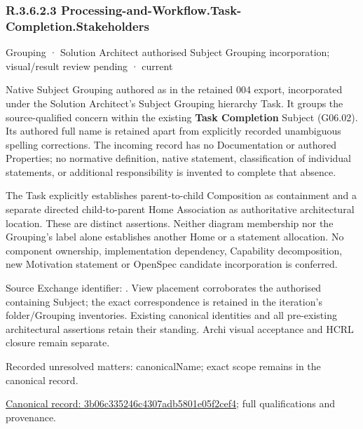 \subsubsection*{R.3.6.2.3 Processing-and-Workflow.Task-Completion.Stakeholders}
\label{navigation:R.3.6.2.3}

\label{element:3b06c335246c4307adb5801e05f2cef4}
{\small Grouping · Solution Architect authorised Subject Grouping incorporation; visual/result review pending · current}\par

Native Subject Grouping authored as \texttt{} in the retained 004 export,
incorporated under the Solution Architect's Subject Grouping hierarchy Task.
It groups the source-qualified \texttt{} concern within
the existing \textbf{Task Completion} Subject (G06.02). Its authored full name
is retained apart from explicitly recorded unambiguous spelling corrections.
The incoming record has no Documentation or authored Properties; no normative
definition, native statement, classification of individual statements, or
additional responsibility is invented to complete that absence.



The Task explicitly establishes parent-to-child Composition as containment and
a separate directed child-to-parent Home Association as authoritative architectural
location. These are distinct assertions. Neither diagram membership nor the
Grouping's label alone establishes another Home or a statement allocation.
No component ownership, implementation dependency, Capability decomposition,
new Motivation statement or OpenSpec candidate incorporation is conferred.



Source Exchange identifier: \texttt{}. View placement corroborates
the authorised containing Subject; the exact correspondence is retained in the
iteration's folder/Grouping inventories. Existing canonical identities and all
pre-existing architectural assertions retain their standing. Archi visual
acceptance and HCRL closure remain separate.


{\small Recorded unresolved matters: canonicalName; exact scope remains in the canonical record.}\par
{\footnotesize \href{../../../../continuum/grouping/3b06c335246c4307adb5801e05f2cef4.md}{Canonical record: 3b06c335246c4307adb5801e05f2cef4}; full qualifications and provenance.}\par
